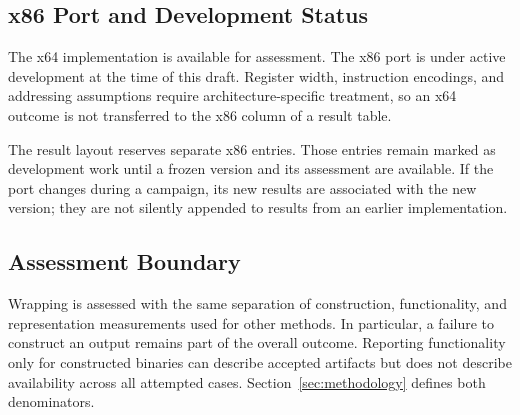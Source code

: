 \subsection{x86 Port and Development Status}
The x64 implementation is available for assessment. The x86 port is
under active development at the time of this draft. Register width,
instruction encodings, and addressing assumptions require
architecture-specific treatment, so an x64 outcome is not transferred
to the x86 column of a result table.

The result layout reserves separate x86 entries. Those entries remain
marked as development work until a frozen version and its assessment
are available. If the port changes during a campaign, its new results
are associated with the new version; they are not silently appended
to results from an earlier implementation.

\subsection{Assessment Boundary}
Wrapping is assessed with the same separation of construction,
functionality, and representation measurements used for other methods.
In particular, a failure to construct an output remains part of the
overall outcome. Reporting functionality only for constructed binaries
can describe accepted artifacts but does not describe availability
across all attempted cases. Section~\ref{sec:methodology} defines both
denominators.
